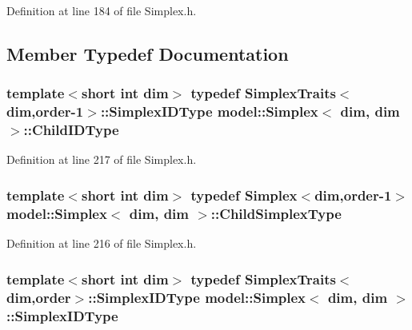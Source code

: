 Definition at line 184 of file Simplex.\+h.



\subsection{Member Typedef Documentation}
\hypertarget{classmodel_1_1_simplex_3_01dim_00_01dim_01_4_ab1ada569e89e2332e245a1ab0cb8a4f9}{}
\subsubsection[{Child\+I\+D\+Type}]{\setlength{\rightskip}{0pt plus 5cm}template$<$short int dim$>$ typedef {\bf Simplex\+Traits}$<${\bf dim},{\bf order}-\/1$>$\+::{\bf Simplex\+I\+D\+Type} {\bf model\+::\+Simplex}$<$ {\bf dim}, {\bf dim} $>$\+::{\bf Child\+I\+D\+Type}}\label{classmodel_1_1_simplex_3_01dim_00_01dim_01_4_ab1ada569e89e2332e245a1ab0cb8a4f9}


Definition at line 217 of file Simplex.\+h.

\hypertarget{classmodel_1_1_simplex_3_01dim_00_01dim_01_4_a98484d69325ced6e24564af07c180261}{}
\subsubsection[{Child\+Simplex\+Type}]{\setlength{\rightskip}{0pt plus 5cm}template$<$short int dim$>$ typedef {\bf Simplex}$<${\bf dim},{\bf order}-\/1$>$ {\bf model\+::\+Simplex}$<$ {\bf dim}, {\bf dim} $>$\+::{\bf Child\+Simplex\+Type}}\label{classmodel_1_1_simplex_3_01dim_00_01dim_01_4_a98484d69325ced6e24564af07c180261}


Definition at line 216 of file Simplex.\+h.

\hypertarget{classmodel_1_1_simplex_3_01dim_00_01dim_01_4_a8d7186530898fce37d1bce8480342a36}{}
\subsubsection[{Simplex\+I\+D\+Type}]{\setlength{\rightskip}{0pt plus 5cm}template$<$short int dim$>$ typedef {\bf Simplex\+Traits}$<${\bf dim},{\bf order}$>$\+::{\bf Simplex\+I\+D\+Type} {\bf model\+::\+Simplex}$<$ {\bf dim}, {\bf dim} $>$\+::{\bf Simplex\+I\+D\+Type}}\label{classmodel_1_1_simplex_3_01dim_00_01dim_01_4_a8d7186530898fce37d1bce8480342a36}


